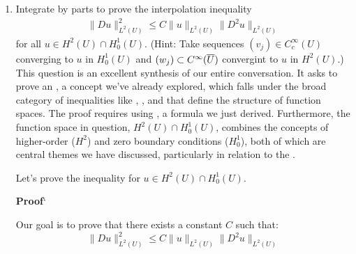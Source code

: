 \documentclass[12pt,a4paper]{report}
\begin{document}
\begin{enumerate}
	\newpage
	\item Integrate by parts to prove the interpolation inequality
	\begin{align*}
		\|Du\|_{L^2(U)}^2 \le C\|u\|_{L^2(U)}\|D^2u\|_{L^2(U)}
	\end{align*}for all $u \in H^2(U)\cap H_0^1(U)$.  (Hint: Take sequences $(v_j) \in C_c^\infty(U)$ converging to $u$ in $H_0^1(U)$ and $(w_j) \subset C^\infty(\overline{U})$ convergint to $u$ in $H^2(U)$.)\\
	
	This question is an excellent synthesis of our entire conversation. It asks to prove an , a concept we've already explored, which falls under the broad category of inequalities like , , and  that define the structure of function spaces. The proof requires using , a formula we just derived. Furthermore, the function space in question, $H^2(U) \cap H_0^1(U)$, combines the concepts of higher-order  ($H^2$) and zero boundary conditions ($H_0^1$), both of which are central themes we have discussed, particularly in relation to the .

Let's prove the inequality for $u \in H^2(U) \cap H_0^1(U)$.

\textbf{Proof}`

Our goal is to prove that there exists a constant $C$ such that:
\[
\|Du\|_{L^2(U)}^2 \le C \|u\|_{L^2(U)}\|D^2u\|_{L^2(U)}
\]

\end{enumerate}
\end{document}
